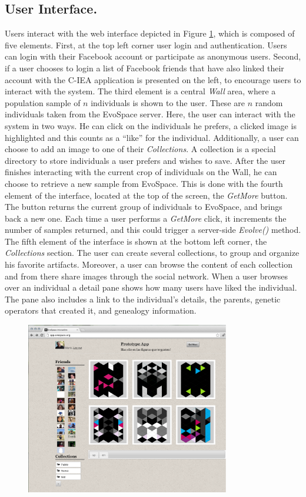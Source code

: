 \documentclass{sig-alternate}
\begin{document}
\subsection{User Interface.}
Users interact with the web interface depicted in Figure \ref{fig:web}, which is composed of five elements.
First, at the top left corner user login and authentication.
Users can login with their Facebook account or participate as anonymous users.
Second, if a user chooses to login a list of Facebook friends that have also linked their account with the C-IEA application is presented on the left, to encourage users to interact with the system. The third element is a central \emph{ Wall } area, where a population sample of $n$ individuals is shown to the user.
These are $n$ random individuals taken from the EvoSpace server.
Here, the user can interact with the system in two ways.
He can click on the individuals he prefers, a clicked image is highlighted and this counts as a ``like'' for the individual.
Additionally, a user can choose to add an image to one of their \emph{Collections}.
A collection is a special directory to store individuals a user prefers and wishes to save. After the user finishes interacting with the current crop of individuals on the Wall, he can choose to retrieve a new sample from EvoSpace.
This is done with the fourth element of the interface, located at the top of the screen, the \emph{GetMore} button.
The button returns the current group of individuals to EvoSpace, and brings back a new one.
Each time a user performs a \emph{GetMore} click, it increments the number of samples returned, and this could  trigger a server-side \emph{Evolve()} method. The fifth element of the interface is shown at the bottom left corner, the \emph{Collections} section.
The user can create several collections, to group and organize his favorite artifacts.
Moreover, a user can browse the content of each collection and from there share images through the social network.
When a user browses over an individual a detail pane shows how many users have liked the individual.
The pane also includes a link to the individual's details, the parents, genetic operators that created it, and genealogy information.


\begin{figure}[!t]
    \centering
        \includegraphics[width=3.5in]{EvoApp.eps}
    \caption{}
    \label{fig:web}
\end{figure}
\end{document}
